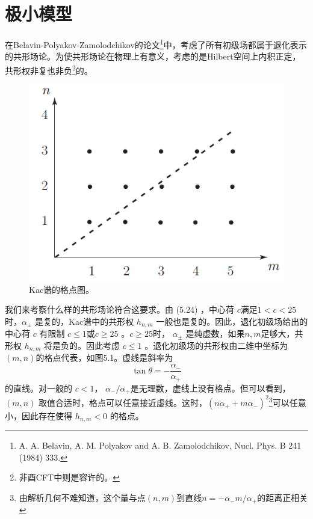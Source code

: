 \section{极小模型}
在Belavin-Polyakov-Zamolodchikov的论文\footnote{A. A. Belavin, A. M. Polyakov and A. B. Zamolodchikov, Nucl. Phys. B 241 (1984) 333.}中，考虑了所有初级场都属于退化表示的共形场论。为使共形场论在物理上有意义，考虑的是Hilbert空间上内积正定，共形权非复也非负\footnote{非酉CFT中则是容许的。}的。

\begin{figure}[h]
	\centering
	\includegraphics[width=0.6\linewidth]{fig/5.1.png}
	\caption{Kac谱的格点图。}
\end{figure}

我们来考察什么样的共形场论符合这要求。由 (5.24) ，中心荷 $c $满足$ 1<c<25$ 时，$ \alpha_\pm$ 是复的，Kac谱中的共形权 $h_{n,m}$ 一般也是复的。因此，退化初级场给出的中心荷 $c$ 有限制 $c\leq 1 $或$c\geq 25$ 。$ c\geq 25$时， $\alpha_\pm$ 是纯虚数，如果$n,m $足够大，共形权 $h_{n,m}$ 将是负的。因此考虑 $c\leq 1$ 。退化初级场的共形权由二维中坐标为$ (m,n) $的格点代表，如图5.1。虚线是斜率为
$$
\tan \theta=-\frac{\alpha_{-}}{\alpha_{+}}
$$
的直线。对一般的 $c<1 $， $\alpha_-/\alpha_+ $是无理数，虚线上没有格点。但可以看到， $(m,n)$ 取值合适时，格点可以任意接近虚线。这时，$ \left(n \alpha_{+}+m \alpha_{-}\right)^{2} $\footnote{由解析几何不难知道，这个量与点$ (n,m) $到直线$ n=-\alpha_- m/\alpha_+ $的距离正相关}可以任意小，因此存在使得 $h_{n,m}<0$ 的格点。

